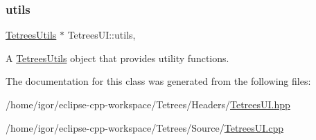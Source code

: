 \subsubsection{\texorpdfstring{utils}{utils}}
{\footnotesize\ttfamily \hyperlink{classTetreesUtils}{Tetrees\+Utils} $\ast$ Tetrees\+U\+I\+::utils\hspace{0.3cm}{\ttfamily [static]}, {\ttfamily [private]}}

A \hyperlink{classTetreesUtils}{Tetrees\+Utils} object that provides utility functions. 

The documentation for this class was generated from the following files\+:\begin{DoxyCompactItemize}
\item 
/home/igor/eclipse-\/cpp-\/workspace/\+Tetrees/\+Headers/\hyperlink{TetreesUI_8hpp}{Tetrees\+U\+I.\+hpp}\item 
/home/igor/eclipse-\/cpp-\/workspace/\+Tetrees/\+Source/\hyperlink{TetreesUI_8cpp}{Tetrees\+U\+I.\+cpp}\end{DoxyCompactItemize}
